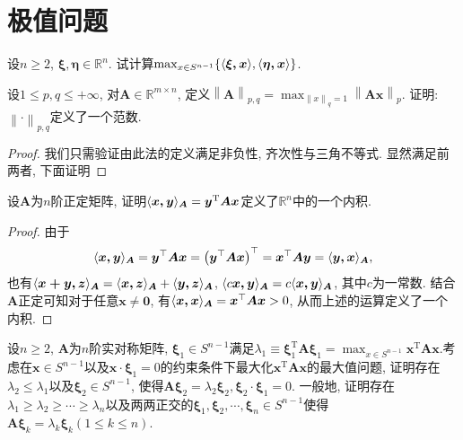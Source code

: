 \section{极值问题}
\begin{quiza}
\woe 设\(n\geqslant 2\), \(\boldsymbol{\xi,\eta}\in\mathbb{R}^n\). 试计算\(\max_{x\in S^{n-1}}\{\langle \boldsymbol{\xi,x} \rangle,\langle \boldsymbol{\eta,x} \rangle\}\).
\begin{solution}

\end{solution}
\woe  设\(1\leqslant p,q\leqslant+\infty\), 对\(\boldsymbol{A}\in\mathbb{R}^{m\times n}\), 定义\(\left\|\boldsymbol{A}\right\|_{p,q}=\max_{\left\|x\right\|_q=1}\left\|\boldsymbol{Ax}\right\|_p\). 证明: \(\left\|\cdot\right\|_{p,q}\)定义了一个范数.
\begin{proof}
我们只需验证由此法的定义满足非负性, 齐次性与三角不等式. 显然满足前两者, 下面证明
\end{proof}
\woe 设\(\boldsymbol{A}\)为\(n\)阶正定矩阵, 证明\(\langle \boldsymbol{x,y} \rangle_{\boldsymbol{A}}=\boldsymbol{y}^{\mathrm{T}}\boldsymbol{Ax}\)定义了\(\mathbb{R}^n\)中的一个内积.
\begin{proof}
由于\[\langle \boldsymbol{x,y} \rangle_{\boldsymbol{A}}=\boldsymbol{y}^{\top}\boldsymbol{Ax}=\left(\boldsymbol{y}^{\top}\boldsymbol{Ax}\right)^\top=\boldsymbol{x}^{\top}\boldsymbol{Ay}=\langle \boldsymbol{y,x} \rangle_{\boldsymbol{A}},\]也有\(\langle \boldsymbol{x+y,z} \rangle_{\boldsymbol{A}}=\langle \boldsymbol{x,z} \rangle_{\boldsymbol{A}}+\langle \boldsymbol{y,z} \rangle_{\boldsymbol{A}}\), \(\langle c\boldsymbol{x,y} \rangle_{\boldsymbol{A}}=c\langle \boldsymbol{x,y} \rangle_{\boldsymbol{A}}\), 其中\(c\)为一常数. 结合\(\boldsymbol{A}\)正定可知对于任意\(\boldsymbol{x}\ne\boldsymbol{0}\), 有\(\langle \boldsymbol{x,x} \rangle_{\boldsymbol{A}}=\boldsymbol{x}^\top\boldsymbol{Ax}>0\), 从而上述的运算定义了一个内积.
\end{proof}
\woe 设\(n\geqslant 2\), \(\boldsymbol{A}\)为\(n\)阶实对称矩阵, \(\boldsymbol{\xi}_1\in S^{n-1}\)满足\(\lambda_1\equiv \boldsymbol{\xi}_1^{\mathrm{T}}\boldsymbol{A}\boldsymbol{\xi}_1=\max_{x\in S^{n-1}}\boldsymbol{x}^{\mathrm{T}}\boldsymbol{A}\boldsymbol{x}.\)考虑在\(\boldsymbol{x}\in S^{n-1}\)以及\(\boldsymbol{x}\cdot\boldsymbol{\xi}_1=0\)的约束条件下最大化\(\boldsymbol{x}^{\mathrm{T}}\boldsymbol{A}\boldsymbol{x}\)的最大值问题, 证明存在\(\lambda_2\leqslant\lambda_1\)以及\(\boldsymbol{\xi}_2\in S^{n-1}\), 使得\(\boldsymbol{A\xi}_2=\lambda_2\boldsymbol{\xi}_2,\boldsymbol{\xi}_2\cdot\boldsymbol{\xi}_1=0\). 一般地, 证明存在\(\lambda_1\geqslant \lambda_2\geqslant\cdots\geqslant\lambda_n\)以及两两正交的\(\boldsymbol{\xi}_1,\boldsymbol{\xi}_2,\cdots,\boldsymbol{\xi}_n\in S^{n-1}\)使得\(\boldsymbol{A}\boldsymbol{\xi}_k=\lambda_k\boldsymbol{\xi}_k(1\leqslant k\leqslant n)\).

\end{quiza}
